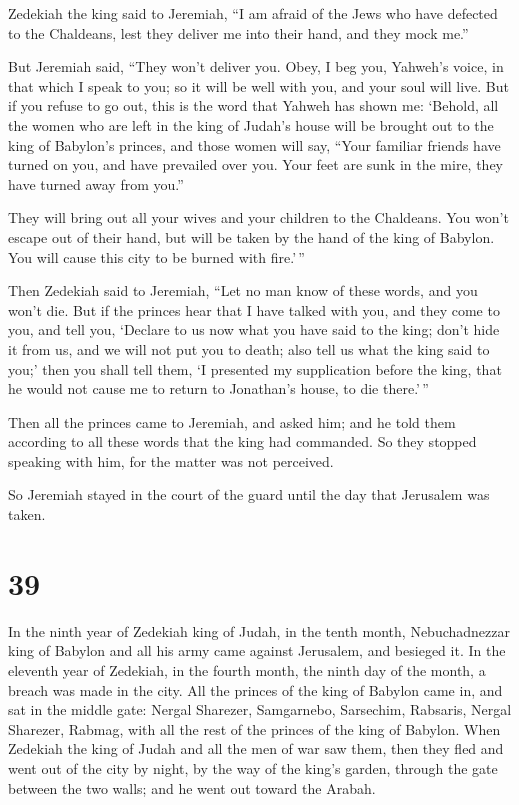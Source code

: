  Zedekiah the king said to Jeremiah, ``I am afraid of the
Jews who have defected to the Chaldeans, lest they deliver me into their
hand, and they mock me.''

 But Jeremiah said, ``They won't deliver you. Obey, I beg
you, Yahweh's voice, in that which I speak to you; so it will be well
with you, and your soul will live.  But if you refuse to go
out, this is the word that Yahweh has shown me:  `Behold,
all the women who are left in the king of Judah's house will be brought
out to the king of Babylon's princes, and those women will say, ``Your
familiar friends have turned on you, and have prevailed over you. Your
feet are sunk in the mire, they have turned away from you.''

 They will bring out all your wives and your children to
the Chaldeans. You won't escape out of their hand, but will be taken by
the hand of the king of Babylon. You will cause this city to be burned
with fire.'\,''

 Then Zedekiah said to Jeremiah, ``Let no man know of these
words, and you won't die.  But if the princes hear that I
have talked with you, and they come to you, and tell you, `Declare to us
now what you have said to the king; don't hide it from us, and we will
not put you to death; also tell us what the king said to you;'
 then you shall tell them, `I presented my supplication
before the king, that he would not cause me to return to Jonathan's
house, to die there.'\,''

 Then all the princes came to Jeremiah, and asked him; and
he told them according to all these words that the king had commanded.
So they stopped speaking with him, for the matter was not perceived.

 So Jeremiah stayed in the court of the guard until the day
that Jerusalem was taken.

\hypertarget{section-38}{%
\section{39}\label{section-38}}

 In the ninth year of Zedekiah king of Judah, in the tenth
month, Nebuchadnezzar king of Babylon and all his army came against
Jerusalem, and besieged it.  In the eleventh year of
Zedekiah, in the fourth month, the ninth day of the month, a breach was
made in the city.  All the princes of the king of Babylon
came in, and sat in the middle gate: Nergal Sharezer, Samgarnebo,
Sarsechim, Rabsaris, Nergal Sharezer, Rabmag, with all the rest of the
princes of the king of Babylon.  When Zedekiah the king of
Judah and all the men of war saw them, then they fled and went out of
the city by night, by the way of the king's garden, through the gate
between the two walls; and he went out toward the Arabah.

